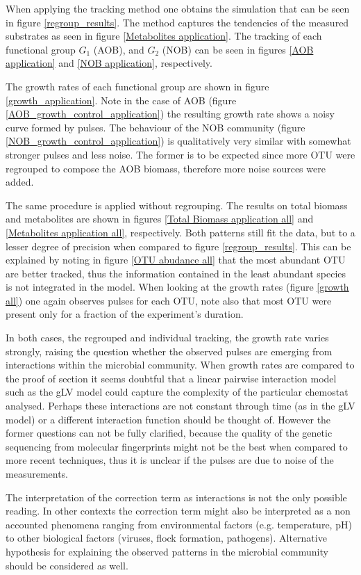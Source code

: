 \documentclass[3p,times]{article}
\begin{document}
When applying the tracking method one obtains the simulation that can be seen in figure \ref{regroup_results}. The method captures the tendencies of the measured substrates as seen in figure \ref{Metabolites application}. The tracking of each functional group $G_1$ (AOB), and $G_2$ (NOB) can be seen in figures \ref{AOB application} and \ref{NOB application}, respectively. 

The growth rates of each functional group are shown in figure \ref{growth_application}. Note in the case of AOB (figure \ref{AOB_growth_control_application}) the resulting growth rate shows a noisy curve formed by pulses. The behaviour of the NOB community (figure \ref{NOB_growth_control_application}) is qualitatively very similar with somewhat stronger pulses and less noise. The former is to be expected since more OTU were regrouped to compose the AOB biomass, therefore more noise sources were added. 

The same procedure is applied without regrouping. The results on total biomass and metabolites are shown in figures \ref{Total Biomass application all} and \ref{Metabolites application all}, respectively. Both patterns still fit the data, but to a lesser degree of precision when compared to figure \ref{regroup_results}. This can be explained by noting in figure \ref{OTU abudance all} that the most abundant OTU are better tracked, thus the information contained in the least abundant species is not integrated in the model. When looking at the growth rates (figure \ref{growth all}) one again observes pulses for each OTU, note also that most OTU were present only for a fraction of the experiment's duration. 

In both cases, the regrouped and individual tracking, the growth rate varies strongly, raising the question whether the observed pulses are emerging from interactions within the microbial community. When growth rates are compared to the proof of section it seems doubtful that a linear pairwise interaction model such as the gLV model could capture the complexity of the particular chemostat analysed. Perhaps these interactions are not constant through time (as in the gLV model) or a different interaction function should be thought of. However the former questions can not be fully clarified, because the quality of the genetic sequencing from molecular fingerprints might not be the best when compared to more recent techniques, thus it is unclear if the pulses are due to noise of the measurements.

The interpretation of the correction term as interactions is not the only possible reading. In other contexts the correction term might also be interpreted as a non accounted phenomena ranging from environmental factors (e.g. temperature, pH) to other biological factors (viruses, flock formation, pathogens). Alternative hypothesis for explaining the observed patterns in the microbial community should be considered as well. 
\end{document}
